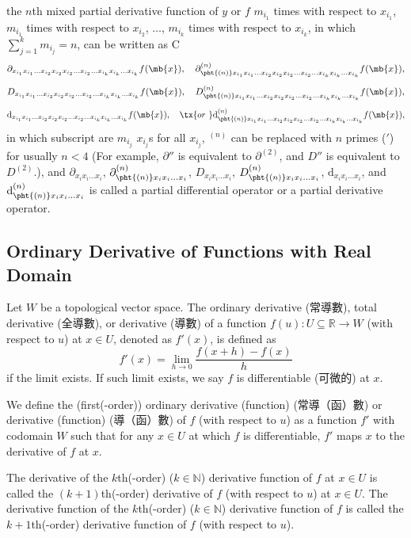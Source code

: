 the $n$th mixed partial derivative function of $y$ or $f$ $m_{i_1}$ times with respect to $x_{i_1}$, $m_{i_1}$ times with respect to $x_{i_2}$, $\dots $, $m_{i_k}$ times with respect to $x_{i_k}$, in which $\sum_{j=1}^km_{i_j}=n$, can be written as
C\[\partial_{x_{i_1}x_{i_1}\dots  x_{i_2}x_{i_2}x_{i_2}\dots  x_{i_2}\dots  x_{i_k}x_{i_k}\dots  x_{i_k}}f(\mb{x}),\quad\partial^{(n)}_{\pht{(n)}x_{i_1}x_{i_1}\dots  x_{i_2}x_{i_2}x_{i_2}\dots  x_{i_2}\dots  x_{i_k}x_{i_k}\dots  x_{i_k}}f(\mb{x}),\]
\[ D_{x_{i_1}x_{i_1}\dots  x_{i_2}x_{i_2}x_{i_2}\dots  x_{i_2}\dots  x_{i_k}x_{i_k}\dots  x_{i_k}}f(\mb{x}),\quad D^{(n)}_{\pht{(n)}x_{i_1}x_{i_1}\dots  x_{i_2}x_{i_2}x_{i_2}\dots  x_{i_2}\dots  x_{i_k}x_{i_k}\dots  x_{i_k}}f(\mb{x}),\]
\[ \mathrm{d}_{x_{i_1}x_{i_1}\dots  x_{i_2}x_{i_2}x_{i_2}\dots  x_{i_2}\dots  x_{i_k}x_{i_k}\dots  x_{i_k}}f(\mb{x}),\quad\tx{or\ }\mathrm{d}^{(n)}_{\pht{(n)}x_{i_1}x_{i_1}\dots  x_{i_2}x_{i_2}x_{i_2}\dots  x_{i_2}\dots  x_{i_k}x_{i_k}\dots  x_{i_k}}f(\mb{x}),\]
in which subscript are $m_{i_j}$ $x_{i_j}$s for all $x_{i_j}$, $^{(n)}$ can be replaced with $n$ primes ($'$) for usually $n<4$ (For example, $\partial''$ is equivalent to $\partial^{(2)}$, and $D''$ is equivalent to $D^{(2)}$.), and $\partial_{x_ix_i\dots  x_i}$, $\partial^{(n)}_{\pht{(n)}x_ix_i\dots  x_i}$, $D_{x_ix_i\dots  x_i}$, $D^{(n)}_{\pht{(n)}x_ix_i\dots  x_i}$, $\mathrm{d}_{x_ix_i\dots  x_i}$, and $\mathrm{d}^{(n)}_{\pht{(n)}x_ix_i\dots  x_i}$ is called a partial differential operator or a partial derivative operator.
\subsection{Ordinary Derivative of Functions with Real Domain}
Let $W$ be a topological vector space. The ordinary derivative (常導數), total derivative (全導數), or derivative (導數) of a function $f(u)\colon U\subseteq\mathbb{R}\to W$ (with respect to $u$) at $x\in U$, denoted as $f'(x)$, is defined as
\[f'(x)=\lim_{h\to 0}\frac{f(x+h)-f(x)}{h}\]
if the limit exists. If such limit exists, we say $f$ is differentiable (可微的) at $x$.

We define the (first(-order)) ordinary derivative (function) (常導（函）數) or derivative (function) (導（函）數) of $f$ (with respect to $u$) as a function $f'$ with codomain $W$ such that for any $x\in U$ at which $f$ is differentiable, $f'$ maps $x$ to the derivative of $f$ at $x$.

The derivative of the $k$th(-order) ($k\in\mathbb{N}$) derivative function of $f$ at $x\in U$ is called the $(k+1)$th(-order) derivative of $f$ (with respect to $u$) at $x\in U$. The derivative function of the $k$th(-order) ($k\in\mathbb{N}$) derivative function of $f$ is called the $k+1$th(-order) derivative function of $f$ (with respect to $u$).


